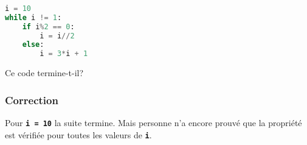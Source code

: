 \documentclass[svgnames,11pt]{beamer}
\begin{document}
\begin{frame}[fragile]
    \frametitle{}

    \begin{activite}
\begin{center}
\begin{lstlisting}[language=Python , basicstyle=\ttfamily\small, xleftmargin=2em, xrightmargin=2em]
i = 10
while i != 1:
    if i%2 == 0:
        i = i//2
    else:
        i = 3*i + 1
\end{lstlisting}
\end{center}
Ce code termine-t-il?
    \end{activite}

\end{frame}
\begin{frame}
    \frametitle{Correction}

Pour \textbf{\texttt{i = 10}} la suite termine. Mais personne n'a encore prouvé que la propriété est vérifiée pour toutes les valeurs de \textbf{\texttt{i}}.   

\end{frame}
\end{document}
